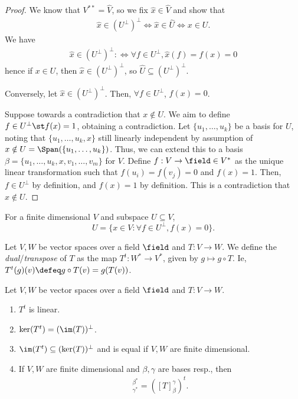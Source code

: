 \begin{proof}
    We know that $V^{\ast \ast} = \hat{V}$, so we fix $\hat{x} \in \hat{V}$ and show that \begin{align*}
        \hat{x} \in (U^\perp)^\perp \iff \hat{x} \in \hat {U} \iff x \in U.
    \end{align*}
We have 
    \begin{align*}
        \hat{x} \in (U^\perp)^\perp :\iff \forall f \in U^\perp, \hat{x}(f) = f(x) = 0
    \end{align*}
    hence if $x \in U$, then $\hat{x} \in (U^\perp)^\perp$, so $\hat{U} \subseteq (U^\perp)^\perp$.

    Conversely, let $\hat{x} \in (U^\perp)^\perp$. Then, $\forall f \in U^\perp$, $f(x) = 0$.
    
    Suppose towards a contradiction that $x \notin U$. We aim to define $f \in U^\perp \st f(x) = 1$, obtaining a contradiction. Let $\{u_1, \dots, u_k\}$ be a basis for $U$, noting that $\{u_1, \dots, u_k, x\}$ still linearly independent by assumption of $x \notin U = \Span(\{u_1, \dots, u_k\})$. Thus, we can extend this to a basis $\beta = \{u_1, \dots, u_k, x, v_1, \dots, v_m\}$ for $V$. Define $f :V \to \field \in V^\ast$ as the unique linear transformation such that $f(u_i) = f(v_j) = 0$ and $f(x) = 1$. Then, $f \in U^\perp$ by definition, and $f(x) = 1$ by definition. This is a contradiction that $x \notin U$.
\end{proof}

\begin{corollary}
    For a finite dimensional $V$ and subspace $U \subseteq V$,
    \[
    U = \{x \in V : \forall f \in U^\perp, f(x) = 0\}.
    \]
\end{corollary}

\begin{definition}
    Let $V, W$ be vector spaces over a field $\field$ and $T : V \to W$. We define the \emph{dual}/\emph{transpose} of $T$ as the map $T^t : W^\ast \to V^\ast$, given by $g \mapsto g\circ T$. Ie, $T^t(g)(v) \defeq g \circ T(v) = g(T(v))$.
\end{definition}

\begin{proposition}\label{prop:propertiesoftranspose}
    Let $V, W$ be vector spaces over a field $\field$ and $T : V \to W$. \begin{enumerate}
        \item $T^t$ is linear.
        \item $\ker(T^t) = (\im(T))^\perp$.
        \item $\im(T^t) \subseteq (\ker(T))^\perp$ and is equal if $V, W$ are finite dimensional.
        \item If $V,W$ are finite dimensional and $\beta, \gamma$ are bases resp., then \begin{align*}
            [T^t]_{\gamma^\ast}^{\beta^\ast} = ([T]_\beta^\gamma)^t.
        \end{align*}
    \end{enumerate}
\end{proposition}

